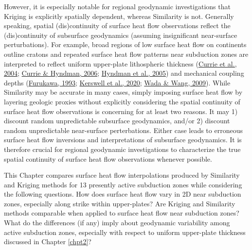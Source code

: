 However, it is especially notable for regional geodynamic investigations that Kriging is explicitly spatially dependent, whereas Similarity is not. Generally speaking, spatial (dis)continuity of surface heat flow observations reflect the (dis)continuity of subsurface geodynamics (assuming insignificant near-surface perturbations). For example, broad regions of low surface heat flow on continents outline cratons and repeated surface heat flow patterns near subduction zones are interpreted to reflect uniform upper-plate lithospheric thickness (\protect\hyperlink{ref-currie2004}{Currie et al., 2004}; \protect\hyperlink{ref-currie2006}{Currie \& Hyndman, 2006}; \protect\hyperlink{ref-hyndman2005}{Hyndman et al., 2005}) and mechanical coupling depths (\protect\hyperlink{ref-furukawa1993}{Furukawa, 1993}; \protect\hyperlink{ref-kerswell2020}{Kerswell et al., 2020}; \protect\hyperlink{ref-wada2009}{Wada \& Wang, 2009}). While Similarity may be accurate in many cases, simply imposing surface heat flow by layering geologic proxies without explicitly considering the spatial continuity of surface heat flow observations is concerning for at least two reasons. It may 1) discount random unpredictable subsurface geodynamics, and/or 2) discount random unpredictable near-surface perterbations. Either case leads to erroneous surface heat flow inversions and interpretations of subsurface geodynamics. It is therefore crucial for regional geodynamic investigations to characterize the true spatial continuity of surface heat flow observations whenever possible.

This Chapter compares surface heat flow interpolations produced by Similarity and Kriging methods for 13 presently active subduction zones while considering the following questions. How does surface heat flow vary in 2D near subduction zones, especially along strike within upper-plates? Are Kriging and Similarity methods comparable when applied to surface heat flow near subduction zones? What do the differences (if any) imply about geodynamic variability among active subduction zones, especially with respect to uniform upper-plate thickness discussed in Chapter \ref{chpt2}?

